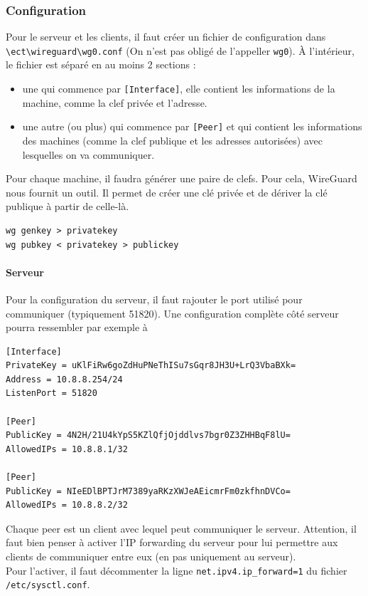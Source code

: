 \documentclass[a4paper, 12pt]{article}
\begin{document}
\subsubsection{Configuration}
Pour le serveur et les clients, il faut créer un fichier de configuration dans \\\verb+\ect\wireguard\wg0.conf+ (On n'est pas obligé de l'appeller \verb+wg0+). À l'intérieur, le fichier est séparé en au moins 2 sections :
\begin{itemize}
\item une qui commence par \verb+[Interface]+, elle contient les informations de la machine, comme la clef privée et l'adresse.
\item une autre (ou plus) qui commence par \verb+[Peer]+ et qui contient les informations des machines (comme la clef publique et les adresses autorisées) avec lesquelles on va communiquer. \\
\end{itemize}

Pour chaque machine, il faudra générer une paire de clefs. Pour cela, WireGuard nous fournit un outil. Il permet de créer une clé privée et de dériver la clé publique à partir de celle-là.

\begin{center}
\begin{minipage}{.6\linewidth}
\begin{lstlisting}[language = shell]
wg genkey > privatekey
wg pubkey < privatekey > publickey
\end{lstlisting}
\end{minipage}
\end{center}

\paragraph{Serveur}
Pour la configuration du serveur, il faut rajouter le port utilisé pour communiquer (typiquement 51820). Une configuration complète côté serveur pourra ressembler par exemple à

\begin{lstlisting}[language = shell]
[Interface]
PrivateKey = uKlFiRw6goZdHuPNeThISu7sGqr8JH3U+LrQ3VbaBXk= 
Address = 10.8.8.254/24
ListenPort = 51820

[Peer]
PublicKey = 4N2H/21U4kYpS5KZlQfjOjddlvs7bgr0Z3ZHHBqF8lU=
AllowedIPs = 10.8.8.1/32

[Peer] 
PublicKey = NIeEDlBPTJrM7389yaRKzXWJeAEicmrFm0zkfhnDVCo=  
AllowedIPs = 10.8.8.2/32
\end{lstlisting}
Chaque peer est un client avec lequel peut communiquer le serveur. Attention, il faut bien penser à activer l'IP forwarding du serveur pour lui permettre aux clients de communiquer entre eux (en pas uniquement au serveur). \\
Pour l'activer, il faut décommenter la ligne \verb+net.ipv4.ip_forward=1+ du fichier \\\verb+/etc/sysctl.conf+.
\end{document}
